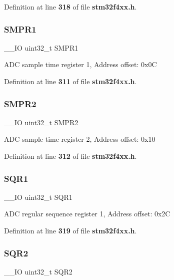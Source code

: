 Definition at line \textbf{ 318} of file \textbf{ stm32f4xx.\+h}.

\mbox{\label{structADC__TypeDef_af9d6c604e365c7d9d7601bf4ef373498}} 
\subsubsection{S\+M\+P\+R1}
{\footnotesize\ttfamily \+\_\+\+\_\+\+IO uint32\+\_\+t S\+M\+P\+R1}

A\+DC sample time register 1, Address offset\+: 0x0C 

Definition at line \textbf{ 311} of file \textbf{ stm32f4xx.\+h}.

\mbox{\label{structADC__TypeDef_a6ac83fae8377c7b7fcae50fa4211b0e8}} 
\subsubsection{S\+M\+P\+R2}
{\footnotesize\ttfamily \+\_\+\+\_\+\+IO uint32\+\_\+t S\+M\+P\+R2}

A\+DC sample time register 2, Address offset\+: 0x10 

Definition at line \textbf{ 312} of file \textbf{ stm32f4xx.\+h}.

\mbox{\label{structADC__TypeDef_a3302e1bcfdfbbfeb58779d0761fb377c}} 
\subsubsection{S\+Q\+R1}
{\footnotesize\ttfamily \+\_\+\+\_\+\+IO uint32\+\_\+t S\+Q\+R1}

A\+DC regular sequence register 1, Address offset\+: 0x2C 

Definition at line \textbf{ 319} of file \textbf{ stm32f4xx.\+h}.

\mbox{\label{structADC__TypeDef_aab440b0ad8631f5666dd32768a89cf60}} 
\subsubsection{S\+Q\+R2}
{\footnotesize\ttfamily \+\_\+\+\_\+\+IO uint32\+\_\+t S\+Q\+R2}

